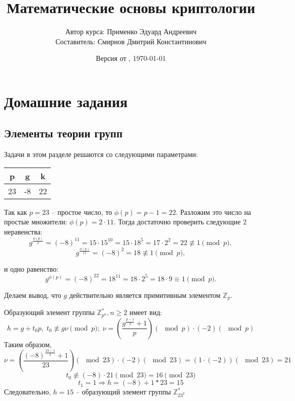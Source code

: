 \documentclass[a4paper,11pt,openany]{book}
\title{Математические основы криптологии}
\author{Автор курса: Применко Эдуард Андреевич \\ 
		Составитель: Смирнов Дмитрий Константинович}
\date{Версия от \currenttime, \today}
\begin{document}
\maketitle
\tableofcontents

\mainmatter
\chapter{Домашние задания}

\section{Элементы теории групп}

Задачи в этом разделе решаются со следующими параметрами:

\medskip

{\centering
\begin{tabular}{||c|c|c||}
\hline
\textbf{p} & \textbf{g} & \textbf{k} \\
\hline
23 & -8 & 22 \\
\hline
\end{tabular}

}

\medskip


Так как $p = 23$ -- простое число, то $\phi(p) = p - 1 = 22$. Разложим это число на простые множители: $\phi(p) = 2 \cdot 11$. Тогда достаточно проверить следующие 2 неравенства:
$$ g^{ \frac{\phi(p)}{2} } = (-8) ^ {11} = 15 \cdot 15 ^ {10} = 15 \cdot 18 ^ 5 = 17 \cdot 2 ^ 2 = 22 \not\equiv 1 \pmod p,$$
$$ g^{ \frac{\phi(p)}{11} } = (-8) ^ {2} = 18 \not\equiv 1 \pmod p,$$

\noindent и одно равенство:
$$ g ^ {\phi (p)} = (-8) ^ {22} = 18 ^ {11} = 18 \cdot 2 ^ 5 = 18 \cdot 9 \equiv 1 \pmod p.$$

Делаем вывод, что $g$ действительно является примитивным элементом $\mathbb{Z}_p$.


Образующий элемент группы $\mathbb{Z}_{p^n}^*, n \ge 2$ имеет вид:
$$ h = g + t_0 p, \; t_0 \not \equiv g \nu \pmod p; \; \nu = ( \frac{ g ^ {\frac{p -1}{2}} + 1}{ p } )(\!\!\!\!\!\! \mod p) \cdot (-2)(\!\!\!\!\!\! \mod p)$$
\noindent Таким образом,
$$ \nu = ( \frac{ (-8) ^ {\frac{23 - 1}{2}} + 1}{ 23 } )(\!\!\!\!\!\! \mod 23) \cdot (-2)(\!\!\!\!\!\! \mod 23) = ( 1 \cdot (-2))(\!\!\!\!\!\! \mod 23) = 21$$
$$ t_0 \not \equiv (-8) \cdot 21 \!\!\!\pmod {23} = 16 \!\!\!\pmod {23} $$
$$ t_1 = 1 \Rightarrow h = (-8) + 1 * 23 = 15 $$
Следовательно, $h = 15$ -- образующий элемент группы $\mathbb{Z}_{23^2}^*$
\end{document}
